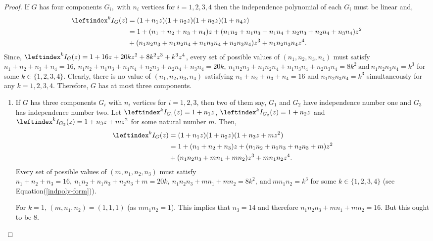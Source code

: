 \documentclass[12pt,a4paper]{article}
\theoremstyle{plain}
\numberwithin{equation}{section}
\begin{document}
\begin{proof}  If \(G\) has four components \(G_i,\) with $n_i$ vertices for \(i = 1, 2, 3, 4\) then the independence polynomial of each \(G_i\) must be linear and,
\begin{align*}
    \leftindex^k{I}_G(z) &= (1+n_1z)(1+n_2z)(1+n_3z)(1+n_4z)\\
    &= 1 + (n_1+n_2+n_3+n_4)z + (n_1n_2+ n_1n_3+ n_1n_4+ n_2n_3+ n_2n_4+ n_3n_4)z^2 \\ &+ (n_1n_2n_3+ n_1n_2n_4+ n_1n_3n_4+ n_2n_3n_4)z^3 + n_1n_2n_3n_4z^4.
\end{align*}
Since, $\leftindex^k{I}_G(z) = 1+16z+20kz^2+8k^2z^3+k^3z^4$, every set of possible values of \((n_1, n_2, n_3, n_4)\) must satisfy \(n_1+n_2+n_3+n_4 = 16,~ n_1n_2+ n_1n_3+ n_1n_4+ n_2n_3+ n_2n_4+ n_3n_4 = 20k,~ n_1n_2n_3+ n_1n_2n_4+ n_1n_3n_4+ n_2n_3n_4 = 8k^2~ \text{and}~ n_1n_2n_3n_4 = k^3\) 
for some \(k \in \{1, 2, 3, 4\}\). Clearly, there is no value of \((n_1, n_2, n_3, n_4)\) satisfying $n_1 +n_2 +n_3 +n_4 =16$ and $n_1 n_2 n_3 n_4 =k^3$  simultaneously for any $k=1,2,3,4$. Therefore, \(G\)   has at most three components.
\begin{enumerate}
	\item 
If \(G\) has three components \(G_i \) with \(n_i\) vertices for \(i = 1, 2, 3\), then two of them say, \(G_1\) and \(G_2\) have independence number one and \(G_3\) has independence number two. Let \(\leftindex^k{I}_{G_1}(z) = 1+n_1z\), \(\leftindex^k{I}_{G_2}(z) = 1+n_2z\) and \(\leftindex^k{I}_{G_3}(z) = 1+n_3z+mz^2\)  for some natural number \(m\). Then, 
\begin{align*}
\leftindex^k{I}_G(z) &= (1+n_1z)(1+n_2z)(1+n_3z+mz^2) \\
&= 1 + (n_1+n_2+n_3)z + (n_1n_2+n_1n_3+n_2n_3+m)z^2\\
&+ (n_1n_2n_3+mn_1+mn_2)z^3 + mn_1n_2z^4.
\end{align*}
Every set of possible values of \((m,n_1,n_2,n_3)\) must satisfy  \(n_1+n_2+n_3 = 16,~ n_1n_2+n_1n_3+n_2n_3+m = 20k,~ n_1n_2n_3+mn_1+mn_2 = 8k^2,~ \text{and}~ mn_1n_2 = k^3\)
for some \(k \in \{1, 2, 3, 4\}\) (see Equation(\ref{indpoly-form})).
\par
For \(k=1\),   \((m, n_1, n_2) = (1,1,1)\) (as $mn_1 n_2 =1$). This implies that \(n_3=14\) and therefore $n_1 n_2 n_3 +mn_1 +mn_2 =16$. But this ought to be $8$.



\end{enumerate}
\end{proof}
\end{document}

